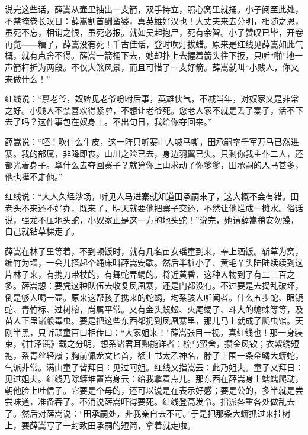 说完这些话，薛嵩从壶里抽出一支箭，双手持立，照心窝里就捅。小子阅至此处，不禁掩卷长叹日：薛嵩割首酬蛮婆，真英雄好汉也！大丈夫来去分明，相随之恩，虽死不忘，相诮之恨，虽死必报。就如吴起抱尸，死有余智。小子赞叹已毕，开卷再览——糟了，薛嵩没有死！千古佳话，登时吹灯拔蜡。原来是红线见薛嵩如此气概，就有点舍不得。薛嵩一箭桶下去，她却扑上去握着箭头往下扳，只听“啪”地一声箭杆折为两段。不仅大煞风景，而且可惜了一支好箭。薛嵩就叫“小贱人，你又来做什么！” 

红线说：“禀老爷，奴婢见老爷吩咐后事，英雄侠气，不减当年，对奴家又是非常之好。小贱人不禁喜欢得紧啦，不想让老爷死。您老人家不就是丢了寨子，活不下去了吗？这件事包在奴身上。不出旬日，我给你夺回来。” 

薛嵩说：“呸！吹什么牛皮，这一阵只听寨中人喊马嘶，田承嗣率千军万马已然进寨。我的部属，非降即丧。山川之险已去，身边羽翼已失。只剩你我主仆二人，还都光着身子。拿什么去夺回寨子？就算你上山求动了你爹爹，田承嗣的人马甚多，他也撵不走他。” 

红线说：“大人久经沙场，听见人马进寨就知道田承嗣来了，这大概不会有错。田老头不来还不好办，既来了，明天就要他把寨子交还，不然让他烂成一摊水。俗话说，强龙不压地头蛇，小奴家正是这一方的地头蛇！”说完，她请薛嵩稍安勿躁，自己就钻草棵走了。 

薛嵩在林子里等着，不到顿饭时，就有几名苗女瑶童到来，奉上酒饭。斩草为窝，编竹为墙，一会儿搭起个绳床叫薛嵩安歇。然后半桩小子、黄毛丫头陆陆续续到这片林子来，有携刀带杖的，有舞蛇弄蝎的。将近黄昏，这种人物到了有二三百之多。薛嵩想：要凭这种队伍去收复凤凰寨，还是门都没有。不过要是去捣乱破坏，倒是够人喝一壶。原来这帮孩子携来的蛇蝎，均系骇人听闻者。什么五步蛇、眼镜蛇、青竹标、过树榕，尚属平常。又有金头蜈蚣、火尾蝎子、斗大的蟾蛛等等，及苗人下蛊诸般毒虫。要是把这些东西都扔到凤凰寨里，那儿马上就成了爬虫馆。天刚半黑，只听顽童百口相传曰：“大家姐来！”薛嵩张目一视，真红线也！那一身装束，《甘泽谣》载之分明，想系诸君耳熟能详者：梳乌蛮舍，攒金风钦；衣紫绣短袍，系青丝轻履；胸前佩龙文匕首，额上书太乙神名，脖子上围一条金鳞大蟒蛇，气派非常。满山童子皆拜日：见过阿姐。红线又指嵩云：此乃姐夫。童子又拜日：见过姐夫。红线乃除蟒堆置嵩身云：给我拿着点儿。那东西在薛嵩身上蠕蠕爬动，朝他脸上吐信子。它要是个母的，还可以说是在表示好感；要是公的，多半就是尝尝味道，准备吞了。不消说薛嵩吓得要死。红线登高发令。指派各重各处做乱去了。然后对薛嵩说：“田承嗣处，非我亲自去不可。”于是把那条大蟒抓过来挂树上，要薛嵩写了一封致田承嗣的短简，拿着就走啦。 

